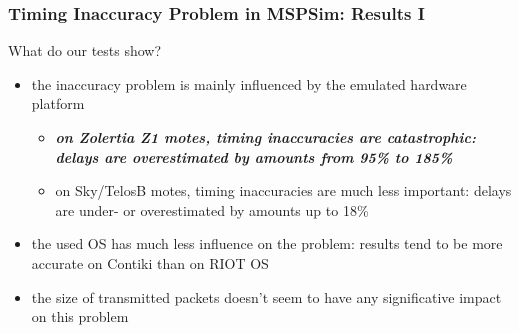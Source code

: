 \documentclass[10pt,c]{beamer}
\renewcommand{\emph}[1]{\textbf{\textit{#1}}}
\begin{document}
\begin{frame}
\frametitle{Timing Inaccuracy Problem in MSPSim: Results I}
\begin{block}{What do our tests show?}
\begin{itemize}
\item the inaccuracy problem is mainly influenced by the emulated hardware
platform
  \begin{itemize}
  \item \emph{on Zolertia Z1 motes, timing inaccuracies are catastrophic:
  delays are overestimated by amounts from 95\% to 185\%}
  \item on Sky/TelosB motes, timing inaccuracies are much less important:
  delays are under- or overestimated by amounts up to 18\%
  \end{itemize}
\item the used OS has much less influence on the problem: results tend
to be more accurate on Contiki than on RIOT OS
\item the size of transmitted packets doesn't seem to have any
significative impact on this problem
\end{itemize}
\end{block}
\end{frame}
\end{document}
